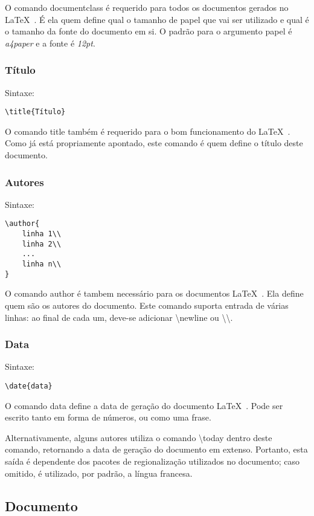 \documentclass[a4paper,12pt]{article}
\begin{document}
O comando documentclass é requerido para todos os documentos gerados no \LaTeX\ . É ela quem define qual o tamanho de papel que vai ser utilizado e qual é o tamanho da fonte do documento em si.
O padrão para o argumento papel é \textit{a4paper} e a fonte é \textit{12pt}.

\subsubsection{Título}
Sintaxe:
\begin{verbatim}
\title{Título}
\end{verbatim}

O comando title também é requerido para o bom funcionamento do \LaTeX\ . Como já está propriamente apontado, este comando é quem define o título deste documento.

\subsubsection{Autores}
Sintaxe:
\begin{verbatim}
\author{
	linha 1\\
	linha 2\\
	...
	linha n\\
}
\end{verbatim}

O comando author é tambem necessário para os documentos \LaTeX\ . Ela define quem são os autores do documento.
Este comando suporta entrada de várias linhas: ao final de cada um, deve-se adicionar \textbackslash newline ou \textbackslash \textbackslash .

\subsubsection{Data}
Sintaxe:
\begin{verbatim}
\date{data}
\end{verbatim}

O comando data define a data de geração do documento \LaTeX\ . Pode ser escrito tanto em forma de números, ou como uma frase.

\hspace{0.1pt}Alternativamente, alguns autores utiliza o comando \textbackslash today dentro deste comando, retornando a data de geração do documento em extenso. Portanto, esta saída é dependente dos pacotes de regionalização utilizados no documento; caso omitido, é utilizado, por padrão, a língua francesa.

\subsection{Documento}
\end{document}
